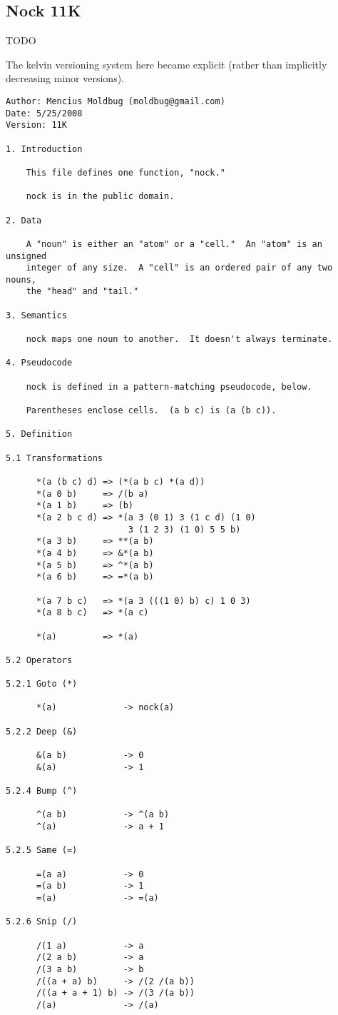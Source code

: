 \documentclass[twoside]{article}
\begin{document}
\subsection{Nock 11K}

TODO

The kelvin versioning system here became explicit (rather than implicitly decreasing minor versions).

\begin{lstlisting}[label=lst:nock11k,caption={Nock 11K, 25 May 2008.},style=listingcode]
Author: Mencius Moldbug (moldbug@gmail.com)
Date: 5/25/2008
Version: 11K

1. Introduction

    This file defines one function, "nock."

    nock is in the public domain.

2. Data

    A "noun" is either an "atom" or a "cell."  An "atom" is an unsigned
    integer of any size.  A "cell" is an ordered pair of any two nouns,
    the "head" and "tail."

3. Semantics

    nock maps one noun to another.  It doesn't always terminate.

4. Pseudocode

    nock is defined in a pattern-matching pseudocode, below.

    Parentheses enclose cells.  (a b c) is (a (b c)).

5. Definition

5.1 Transformations

      *(a (b c) d) => (*(a b c) *(a d))
      *(a 0 b)     => /(b a)
      *(a 1 b)     => (b)
      *(a 2 b c d) => *(a 3 (0 1) 3 (1 c d) (1 0)
                        3 (1 2 3) (1 0) 5 5 b)
      *(a 3 b)     => **(a b)
      *(a 4 b)     => &*(a b)
      *(a 5 b)     => ^*(a b)
      *(a 6 b)     => =*(a b)

      *(a 7 b c)   => *(a 3 (((1 0) b) c) 1 0 3)
      *(a 8 b c)   => *(a c)

      *(a)         => *(a)

5.2 Operators

5.2.1 Goto (*)

      *(a)             -> nock(a)

5.2.2 Deep (&)

      &(a b)           -> 0
      &(a)             -> 1

5.2.4 Bump (^)

      ^(a b)           -> ^(a b)
      ^(a)             -> a + 1

5.2.5 Same (=)

      =(a a)           -> 0
      =(a b)           -> 1
      =(a)             -> =(a)

5.2.6 Snip (/)

      /(1 a)           -> a
      /(2 a b)         -> a
      /(3 a b)         -> b
      /((a + a) b)     -> /(2 /(a b))
      /((a + a + 1) b) -> /(3 /(a b))
      /(a)             -> /(a)
\end{lstlisting}
\end{document}
